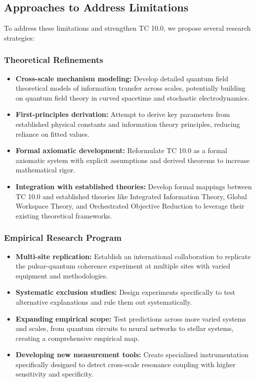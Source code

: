 \documentclass[12pt]{article}
\begin{document}
\subsection{Approaches to Address Limitations}

To address these limitations and strengthen TC 10.0, we propose several research strategies:

\subsubsection{Theoretical Refinements}

\begin{itemize}
    \item \textbf{Cross-scale mechanism modeling:} Develop detailed quantum field theoretical models of information transfer across scales, potentially building on quantum field theory in curved spacetime and stochastic electrodynamics.
    
    \item \textbf{First-principles derivation:} Attempt to derive key parameters from established physical constants and information theory principles, reducing reliance on fitted values.
    
    \item \textbf{Formal axiomatic development:} Reformulate TC 10.0 as a formal axiomatic system with explicit assumptions and derived theorems to increase mathematical rigor.
    
    \item \textbf{Integration with established theories:} Develop formal mappings between TC 10.0 and established theories like Integrated Information Theory, Global Workspace Theory, and Orchestrated Objective Reduction to leverage their existing theoretical frameworks.
\end{itemize}

\subsubsection{Empirical Research Program}

\begin{itemize}
    \item \textbf{Multi-site replication:} Establish an international collaboration to replicate the pulsar-quantum coherence experiment at multiple sites with varied equipment and methodologies.
    
    \item \textbf{Systematic exclusion studies:} Design experiments specifically to test alternative explanations and rule them out systematically.
    
    \item \textbf{Expanding empirical scope:} Test predictions across more varied systems and scales, from quantum circuits to neural networks to stellar systems, creating a comprehensive empirical map.
    
    \item \textbf{Developing new measurement tools:} Create specialized instrumentation specifically designed to detect cross-scale resonance coupling with higher sensitivity and specificity.
\end{itemize}
\end{document}
